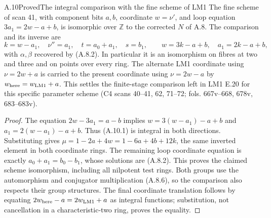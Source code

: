 \begin{statement}{A.10}{Proved}{The integral comparison with the fine scheme of LM1}
The fine scheme of scan 41, with component bits $a,b$, coordinate
$w=\nu'$, and loop equation $3a_1=2w-a+b$, is isomorphic over
$\mathbb Z$ to the corrected $N$ of A.8. The comparison and its
inverse are
\[
 k=w-a_1,\quad \nu''=a_1,\quad
 t=a_0+a_1,\quad s=b_1,
 \qquad
 w=3k-a+b,\quad a_1=2k-a+b,                       \tag{A.10.1}
\]
with $\alpha,\beta$ recovered by (A.8.2). In particular it is an
isomorphism on fibres at two and three and on points over every ring.
The alternate LM1 coordinate using $\nu=2w+a$ is carried to the
present coordinate using $\nu=2w-a$ by $w_{\rm here}=w_{\rm LM1}+a$.
This settles the finite-stage comparison left in LM1 E.20 for this
specific parameter scheme (C4 scans 40--41, 62, 71--72;
fols. 667v--668, 678v, 683--683v).
\end{statement}
\begin{proof}
The equation $2w-3a_1=a-b$ implies
$w=3(w-a_1)-a+b$ and $a_1=2(w-a_1)-a+b$.
Thus (A.10.1) is integral in both directions. Substituting gives
$\mu=1-2a+4w=1-6a+4b+12k$, the same inverted element in both
coordinate rings. The remaining loop coordinate equation is exactly
$a_0+a_1=b_0-b_1$, whose solutions are (A.8.2).
This proves the claimed scheme isomorphism, including all nilpotent
test rings. Both groups use the automorphism and conjugator
multiplication (A.8.6), so the comparison also respects their group
structures. The final coordinate translation follows by equating
$2w_{\rm here}-a=2w_{\rm LM1}+a$ as integral functions; substitution,
not cancellation in a characteristic-two ring, proves the equality.
\end{proof}

